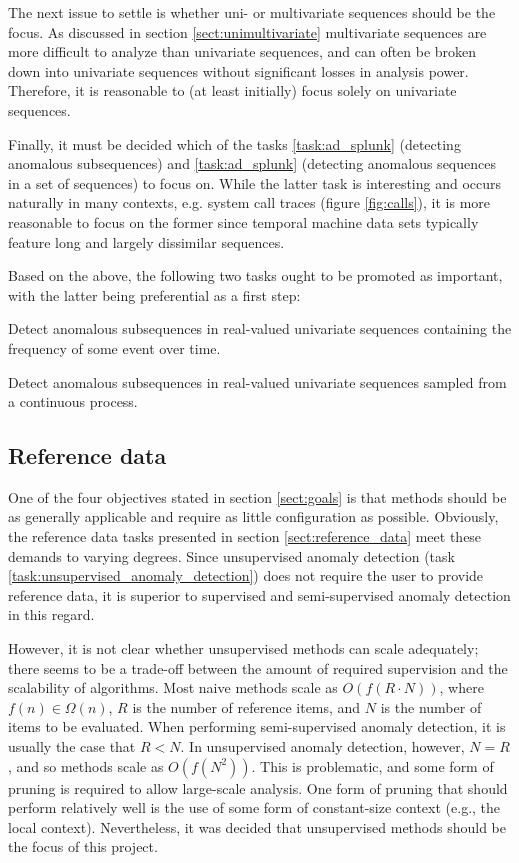 The next issue to settle is whether uni- or multivariate sequences should be the focus. As discussed in section \ref{sect:unimultivariate} multivariate sequences are more difficult to analyze than univariate sequences, and can often be broken down into univariate sequences without significant losses in analysis power. Therefore, it is reasonable to (at least initially) focus solely on univariate sequences.

Finally, it must be decided which of the tasks \ref{task:ad_splunk} (detecting anomalous subsequences) and \ref{task:ad_splunk} (detecting anomalous sequences in a set of sequences) to focus on. While the latter task is interesting and occurs naturally in many contexts, e.g. system call traces (figure \ref{fig:calls}), it is more reasonable to focus on the former since temporal machine data sets typically feature long and largely dissimilar sequences.

Based on the above, the following two tasks ought to be promoted as important, with the latter being preferential as a first step:
\begin{task}
  \label{task:frequency}
  Detect anomalous subsequences in real-valued univariate sequences containing the frequency of some event over time.
\end{task}
\begin{task}
  \label{task:continuous}
  Detect anomalous subsequences in real-valued univariate sequences sampled from a continuous process.
\end{task}

\subsection{Reference data}

One of the four objectives stated in section \ref{sect:goals} is that methods should be as generally applicable and require as little configuration as possible. Obviously, the reference data tasks presented in section \ref{sect:reference_data} meet these demands to varying degrees. Since unsupervised anomaly detection (task \ref{task:unsupervised_anomaly_detection}) does not require the user to provide reference data, it is superior to supervised and semi-supervised anomaly detection in this regard.

However, it is not clear whether unsupervised methods can scale adequately; there seems to be a trade-off between the amount of required supervision and the scalability of algorithms. Most naive methods scale as $O(f(R \cdot N))$, where $f(n) \in \Omega(n)$, $R$ is the number of reference items, and $N$ is the number of items to be evaluated. When performing semi-supervised anomaly detection, it is usually the case that $R < N$. In unsupervised anomaly detection, however, $N = R$, and so methods scale as $O(f(N^2))$. This is problematic, and some form of pruning is required to allow large-scale analysis. One form of pruning that should perform relatively well is the use of some form of constant-size context (e.g., the local context). Nevertheless, it was decided that unsupervised methods should be the focus of this project.

